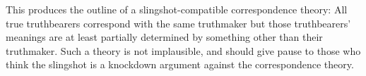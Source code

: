 This produces the outline of a slingshot-compatible correspondence theory:
All true truthbearers correspond with the same truthmaker but those truthbearers' meanings are at least partially determined by something other than their truthmaker.
Such a theory is not implausible, and should give pause to those who think the slingshot is a knockdown argument against the correspondence theory.

